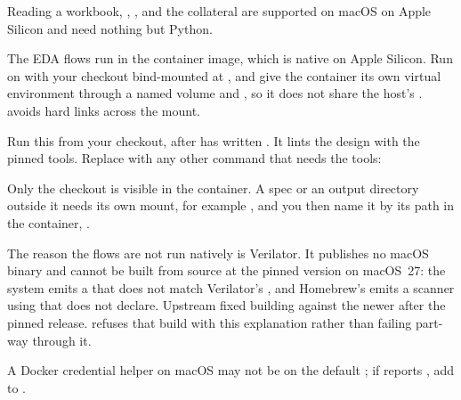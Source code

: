 Reading a workbook, , ,  and the
collateral are supported on macOS on Apple Silicon and need nothing but Python.

The EDA flows run in the container image, which is native on Apple Silicon. Run
 on  with your checkout
bind-mounted at , and give the container its own virtual environment through a
named volume and , so it does not share the host's
.  avoids hard links across the mount.

Run this from your checkout, after  has written . It lints
the design with the pinned tools. Replace  with any other
 command that needs the tools:



Only the checkout is visible in the container. A spec or an output directory outside it
needs its own mount, for example , and you then name it
by its path in the container, .

The reason the flows are not run natively is Verilator. It publishes no macOS binary and
cannot be built from source at the pinned version on macOS~27: the system
 emits a  that does not match Verilator's
, and Homebrew's  emits a scanner using
 that  does not declare. Upstream fixed building
against the newer  after the pinned release.
 refuses that build with this explanation rather than
failing part-way through it.

A Docker credential helper on macOS may not be on the default ; if
 reports , add
 to .
